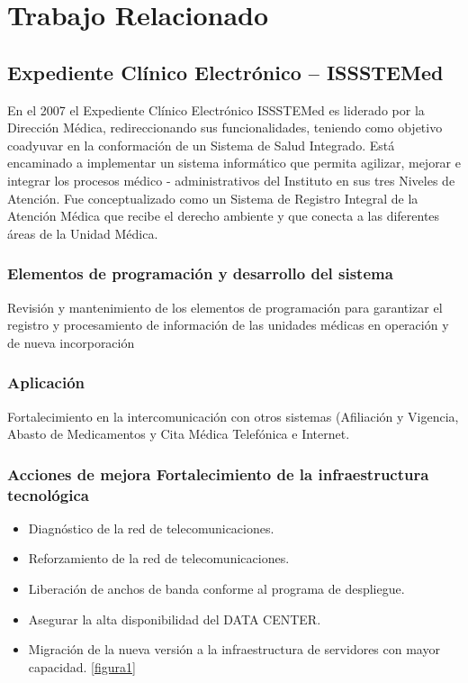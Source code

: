 \chapter{Trabajo Relacionado}

\section{Expediente Clínico Electrónico – ISSSTEMed}

En el 2007 el Expediente Clínico Electrónico ISSSTEMed es liderado por la Dirección Médica, redireccionando sus funcionalidades, teniendo como objetivo coadyuvar en la conformación de un Sistema de Salud Integrado. Está encaminado a implementar un sistema informático que permita agilizar, mejorar e integrar los procesos médico - administrativos del Instituto en sus tres Niveles de Atención. Fue conceptualizado como un Sistema de Registro Integral de la Atención Médica que recibe el derecho ambiente y que conecta a las diferentes áreas de la Unidad Médica. \cite{ISSTE}

\subsection{Elementos de programación y desarrollo del sistema}
 Revisión y mantenimiento de los elementos de programación para garantizar el registro y procesamiento de información de las unidades médicas en operación y de nueva incorporación \cite{ISSTE}

\subsection{Aplicación}
 Fortalecimiento en la intercomunicación con otros sistemas (Afiliación y Vigencia, Abasto de Medicamentos y Cita Médica Telefónica e Internet.

\subsection{Acciones de mejora Fortalecimiento de la infraestructura tecnológica }
\begin{itemize}
  \item Diagnóstico de la red de telecomunicaciones.
  \item Reforzamiento de la red de telecomunicaciones.
  \item Liberación de anchos de banda conforme al programa de despliegue.
  \item Asegurar la alta disponibilidad del DATA CENTER.
  \item Migración de la nueva versión a la infraestructura de servidores con mayor capacidad. \ref{figura1}


\end{itemize}

